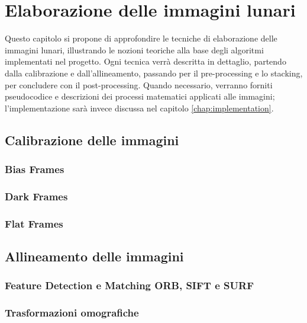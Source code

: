 \chapter{Elaborazione delle immagini lunari} \label{chap:techniques}

Questo capitolo si propone di approfondire le tecniche di elaborazione delle immagini lunari, illustrando le nozioni teoriche alla base degli algoritmi implementati nel progetto. Ogni tecnica verrà descritta in dettaglio, partendo dalla calibrazione e dall'allineamento, passando per il pre-processing e lo stacking, per concludere con il post-processing. Quando necessario, verranno forniti pseudocodice e descrizioni dei processi matematici applicati alle immagini; l'implementazione sarà invece discussa nel capitolo \ref{chap:implementation}.

\section{Calibrazione delle immagini} \label{sec:calibration}

\subsection{Bias Frames} \label{subsec:bias}

\subsection{Dark Frames} \label{subsec:dark}

\subsection{Flat Frames} \label{subsec:flat}

\section{Allineamento delle immagini} \label{sec:alignment}

\subsection{Feature Detection e Matching ORB, SIFT e SURF} \label{subsec:feature_detectoion}

\subsection{Trasformazioni omografiche} \label{subsec:homography}

